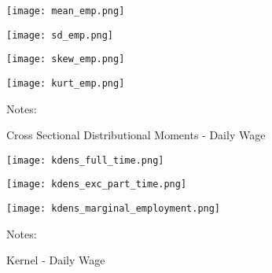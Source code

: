 \documentclass[12pt, a4paper]{article}
\begin{document}
\begin{figure}[!h]
\captionsetup{font=large}
\caption{Cross Sectional Distributional Moments - Daily Wage}
	\begin{minipage}[b]{0.48\textwidth} 
		\centering
		\texttt{[image: mean\_emp.png]}
		\label{fig:mean_emp}
	\end{minipage}
	\begin{minipage}[b]{0.48\textwidth}
		\centering
		\texttt{[image: sd\_emp.png]}
		\label{fig:var_emp}
	\end{minipage}
	\begin{minipage}[b]{0.48\textwidth} 
		\centering
		\texttt{[image: skew\_emp.png]}
		\label{fig:skew_emp}
	\end{minipage}
	\begin{minipage}[b]{0.48\textwidth}
		\centering
		\texttt{[image: kurt\_emp.png]}
		\label{fig:kurt_emp}
	\end{minipage}
\footnotesize{
\justifying Notes: \par} 
\end{figure}

\begin{figure}[!h]
\captionsetup{font=large}
\caption{Kernel - Daily Wage}
	\begin{minipage}[b]{0.32\textwidth} 
		\centering
		\texttt{[image: kdens\_full\_time.png]}
		\label{fig:kdens_full_time}
	\end{minipage}
	\begin{minipage}[b]{0.32\textwidth}
		\centering
		\texttt{[image: kdens\_exc\_part\_time.png]}
		\label{fig:kdens_exc_part_time}
	\end{minipage}
	\begin{minipage}[b]{0.32\textwidth} 
		\centering
		\texttt{[image: kdens\_marginal\_employment.png]}
		\label{fig:kdens_marginal_employment}
	\end{minipage}
\footnotesize{
\justifying Notes: \par} 
\end{figure}
\end{document}
